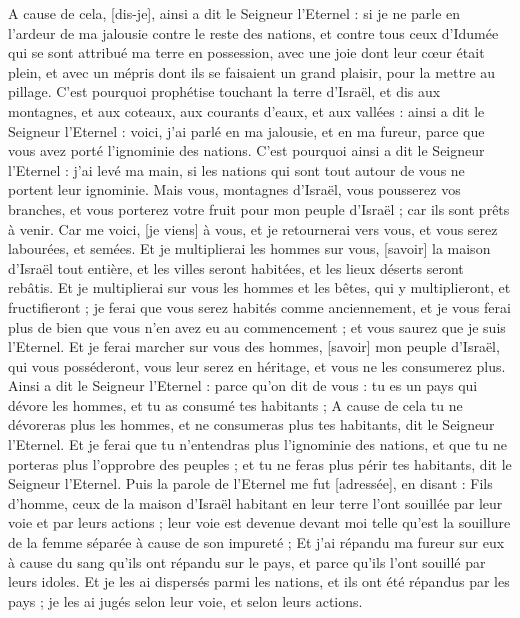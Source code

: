 \begin{multicols}{2}
A cause de cela, [dis-je], ainsi a dit le Seigneur l'Eternel : si je ne parle en l'ardeur de ma jalousie contre le reste des nations, et contre tous ceux d'Idumée qui se sont attribué ma terre en possession, avec une joie dont leur cœur était plein, et avec un mépris dont ils se faisaient un grand plaisir, pour la mettre au pillage.
C'est pourquoi prophétise touchant la terre d'Israël, et dis aux montagnes, et aux coteaux, aux courants d'eaux, et aux vallées : ainsi a dit le Seigneur l'Eternel : voici, j'ai parlé en ma jalousie, et en ma fureur, parce que vous avez porté l'ignominie des nations.
C'est pourquoi ainsi a dit le Seigneur l'Eternel : j'ai levé ma main, si les nations qui sont tout autour de vous ne portent leur ignominie.
Mais vous, montagnes d'Israël, vous pousserez vos branches, et vous porterez votre fruit pour mon peuple d'Israël ; car ils sont prêts à venir.
Car me voici, [je viens] à vous, et je retournerai vers vous, et vous serez labourées, et semées.
Et je multiplierai les hommes sur vous, [savoir] la maison d'Israël tout entière, et les villes seront habitées, et les lieux déserts seront rebâtis.
Et je multiplierai sur vous les hommes et les bêtes, qui y multiplieront, et fructifieront ; je ferai que vous serez habités comme anciennement, et je vous ferai plus de bien que vous n'en avez eu au commencement ; et vous saurez que je suis l'Eternel.
Et je ferai marcher sur vous des hommes, [savoir] mon peuple d'Israël, qui vous posséderont, vous leur serez en héritage, et vous ne les consumerez plus.
Ainsi a dit le Seigneur l'Eternel : parce qu'on dit de vous : tu es un pays qui dévore les hommes, et tu as consumé tes habitants ;
A cause de cela tu ne dévoreras plus les hommes, et ne consumeras plus tes habitants, dit le Seigneur l'Eternel.
Et je ferai que tu n'entendras plus l'ignominie des nations, et que tu ne porteras plus l'opprobre des peuples ; et tu ne feras plus périr tes habitants, dit le Seigneur l'Eternel.
Puis la parole de l'Eternel me fut [adressée], en disant :
Fils d'homme, ceux de la maison d'Israël habitant en leur terre l'ont souillée par leur voie et par leurs actions ; leur voie est devenue devant moi telle qu'est la souillure de la femme séparée à cause de son impureté ;
Et j'ai répandu ma fureur sur eux à cause du sang qu'ils ont répandu sur le pays, et parce qu'ils l'ont souillé par leurs idoles.
Et je les ai dispersés parmi les nations, et ils ont été répandus par les pays ; je les ai jugés selon leur voie, et selon leurs actions.

\end{multicols}
